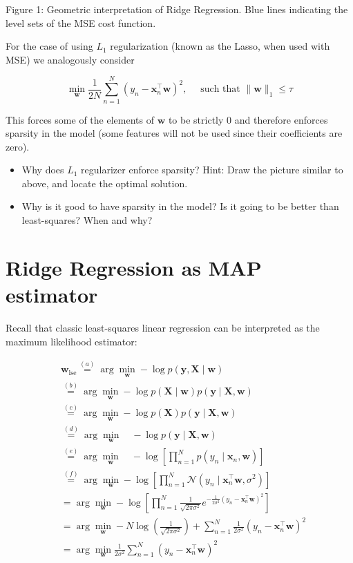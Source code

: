\documentclass[10pt]{article}
\begin{document}
Figure 1: Geometric interpretation of Ridge Regression. Blue lines indicating the level sets of the MSE cost function.

For the case of using $L_{1}$ regularization (known as the Lasso, when used with MSE) we analogously consider

$$
\min _{\mathbf{w}} \frac{1}{2 N} \sum_{n=1}^{N}\left(y_{n}-\mathbf{x}_{n}^{\top} \mathbf{w}\right)^{2}, \quad \text { such that }\|\mathbf{w}\|_{1} \leq \tau
$$

This forces some of the elements of $\mathbf{w}$ to be strictly 0 and therefore enforces sparsity in the model (some features will not be used since their coefficients are zero).

\begin{itemize}
  \item Why does $L_{1}$ regularizer enforce sparsity? Hint: Draw the picture similar to above, and locate the optimal solution.
  \item Why is it good to have sparsity in the model? Is it going to be better than least-squares? When and why?
\end{itemize}

\section*{Ridge Regression as MAP estimator}
Recall that classic least-squares linear regression can be interpreted as the maximum likelihood estimator:

$$
\begin{aligned}
& \mathbf{w}_{\mathrm{lse}} \stackrel{(a)}{=} \arg \min _{\mathbf{w}}-\log p(\mathbf{y}, \mathbf{X} \mid \mathbf{w}) \\
& \stackrel{(b)}{=} \arg \min _{\mathbf{w}}-\log p(\mathbf{X} \mid \mathbf{w}) p(\mathbf{y} \mid \mathbf{X}, \mathbf{w}) \\
& \stackrel{(c)}{=} \arg \min _{\mathbf{w}}-\log p(\mathbf{X}) p(\mathbf{y} \mid \mathbf{X}, \mathbf{w}) \\
& \stackrel{(d)}{=} \arg \min _{\mathbf{w}} \quad-\log p(\mathbf{y} \mid \mathbf{X}, \mathbf{w}) \\
& \stackrel{(e)}{=} \arg \min _{\mathbf{w}} \quad-\log \left[\prod_{n=1}^{N} p\left(y_{n} \mid \mathbf{x}_{n}, \mathbf{w}\right)\right] \\
& \stackrel{(f)}{=} \arg \min _{\mathbf{w}}-\log \left[\prod_{n=1}^{N} \mathcal{N}\left(y_{n} \mid \mathbf{x}_{n}^{\top} \mathbf{w}, \sigma^{2}\right)\right] \\
& =\arg \min _{\mathbf{w}}-\log \left[\prod_{n=1}^{N} \frac{1}{\sqrt{2 \pi \sigma^{2}}} e^{-\frac{1}{2 \sigma^{2}}\left(y_{n}-\mathbf{x}_{n}^{\top} \mathbf{w}\right)^{2}}\right] \\
& =\arg \min _{\mathbf{w}}-N \log \left(\frac{1}{\sqrt{2 \pi \sigma^{2}}}\right)+\sum_{n=1}^{N} \frac{1}{2 \sigma^{2}}\left(y_{n}-\mathbf{x}_{n}^{\top} \mathbf{w}\right)^{2} \\
& =\arg \min _{\mathbf{w}} \frac{1}{2 \sigma^{2}} \sum_{n=1}^{N}\left(y_{n}-\mathbf{x}_{n}^{\top} \mathbf{w}\right)^{2}
\end{aligned}
$$
\end{document}
